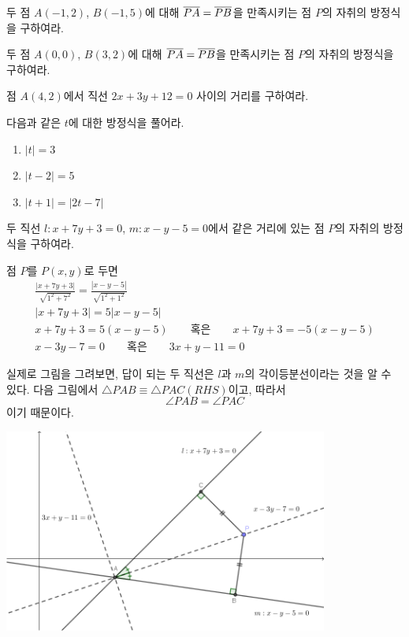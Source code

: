 \documentclass{oblivoir}
\begin{document}
%
\prob{}\label{trace4}
두 점 \(A(-1,2)\), \(B(-1,5)\)에 대해 \(\overline{PA}=\overline{PB}\)을 만족시키는 점 \(P\)의 자취의 방정식을 구하여라.

%
\prob{}\label{trace5}
두 점 \(A(0,0)\), \(B(3,2)\)에 대해 \(\overline{PA}=\overline{PB}\)을 만족시키는 점 \(P\)의 자취의 방정식을 구하여라.

\newpage

\prob{}\label{trace6}
점 \(A(4,2)\)에서 직선 \(2x+3y+12=0\) 사이의 거리를 구하여라.

\prob{}\label{trace7}
다음과 같은 \(t\)에 대한 방정식을 풀어라.
\begin{enumerate}
\item
\(|t|=3\)
\item
\(|t-2|=5\)
\item
\(|t+1|=|2t-7|\)
\end{enumerate}

%
\exam{}\label{trace8}
두 직선 \(l:x+7y+3=0\), \(m:x-y-5=0\)에서 같은 거리에 있는 점 \(P\)의 자취의 방정식을 구하여라.

\begin{mdframed}
점 \(P\)를 \(P(x,y)\)로 두면
\begin{gather*}
\frac{|x+7y+3|}{\sqrt{1^2+7^2}}=\frac{|x-y-5|}{\sqrt{1^2+1^2}}\\
|x+7y+3|=5|x-y-5|\\
x+7y+3=5(x-y-5)\qquad\text{혹은}\qquad x+7y+3=-5(x-y-5)\\
x-3y-7=0\qquad\text{혹은}\qquad 3x+y-11=0
\end{gather*}
\end{mdframed}
실제로 그림을 그려보면, 답이 되는 두 직선은 \(l\)과 \(m\)의 각이등분선이라는 것을 알 수 있다.
다음 그림에서 \(\triangle PAB\equiv\triangle PAC(RHS)\)이고, 따라서
\[\angle PAB=\angle PAC\]
이기 때문이다.
\begin{center}
\includegraphics[width=0.8\textwidth]{trace_7}
\end{center}
\end{document}
